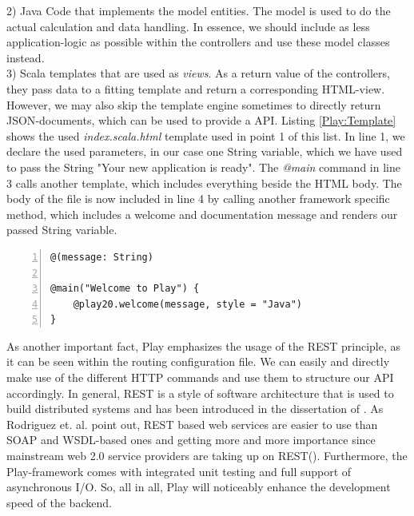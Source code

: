 2) Java Code that implements the model entities. The model is used to do the actual calculation and data handling. In essence, we should include as less application-logic as possible within the controllers and use these model classes instead. \\
3) Scala templates that are used as \textit{views}. As a return value of the controllers, they pass data to a fitting template and return a corresponding \ac{HTML}-view. However, we may also skip the template engine sometimes to directly return \ac{JSON}-documents, which can be used to provide a \ac{API}. Listing \ref{Play:Template} shows the used \textit{index.scala.html} template used in point 1 of this list. In line 1, we declare the used parameters, in our case one String variable, which we have used to pass the String "Your new application is ready". The \textit{@main} command in line 3 calls another template, which includes everything beside the \ac{HTML} body. The body of the file is now included in line 4 by calling another framework specific method, which includes a welcome and documentation message and renders our passed String variable.

\begin{lstlisting}[numbers=left,caption={Simple Scala template within the Play Framework},label=Play:Template,frame=tlbr,breaklines]
@(message: String)

@main("Welcome to Play") {
    @play20.welcome(message, style = "Java")
}
\end{lstlisting}

As another important fact, Play emphasizes the usage of the \ac{REST} principle, as it can be seen within the routing configuration file. We can easily and directly make use of the different \ac{HTTP} commands and use them to structure our \ac{API} accordingly. In general, \acf{REST} is a style of software architecture that is used to build distributed systems and has been introduced in the dissertation of \cite{Fielding2000}. 
As Rodriguez et. al. point out, \ac{REST} based web services are easier to use than \acf{SOAP} and \acf{WSDL}-based ones and getting more and more importance since mainstream web 2.0 service providers are taking up on \ac{REST}(\cite{Rodriguez2008}). Furthermore, the Play-framework comes with integrated unit testing and full support of asynchronous I/O. So, all in all, Play will noticeably enhance the development speed of the backend.

